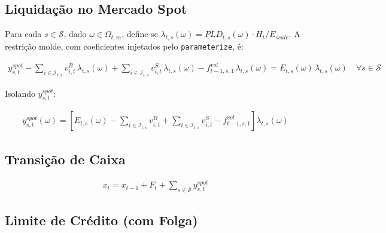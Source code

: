 \documentclass{article}
\begin{document}
\subsection{Liquidação no Mercado Spot}

Para cada $s \in \mathcal{S}$, dado $\omega \in \Omega_{t,m}$, define-se
$\lambda_{t,s}(\omega) = PLD_{t,s}(\omega) \cdot H_t / E_{scale}$. A restrição molde,
com coeficientes injetados pelo \texttt{parameterize}, é:

\begin{align}
    y^{spot}_{s,t}
    - \sum_{i \in \mathcal{I}_{t,s}} v^{B}_{i,t}\, \lambda_{t,s}(\omega)
    + \sum_{i \in \mathcal{I}_{t,s}} v^{S}_{i,t}\, \lambda_{t,s}(\omega)
    - f^{vol}_{t-1,s,1}\, \lambda_{t,s}(\omega)
    = E_{t,s}(\omega)\, \lambda_{t,s}(\omega)
    \quad \forall s \in \mathcal{S}
\end{align}

Isolando $y^{spot}_{s,t}$:

\begin{align}
    y^{spot}_{s,t}(\omega) =
    \left[
        E_{t,s}(\omega)
        - \sum_{i \in \mathcal{I}_{t,s}} v^{B}_{i,t}
        + \sum_{i \in \mathcal{I}_{t,s}} v^{S}_{i,t}
        - f^{vol}_{t-1,s,1}
    \right]
    \lambda_{t,s}(\omega)
\end{align}

\subsection{Transição de Caixa}

\begin{align}
    x_t = x_{t-1} + F_t + \sum_{s \in \mathcal{S}} y^{spot}_{s,t}
\end{align}

\subsection{Limite de Crédito (com Folga)}
\end{document}
